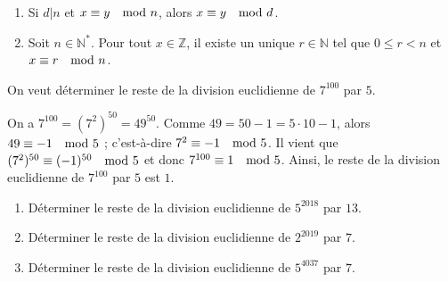       \begin{prop}
            \begin{enumerate}
                  \item Si $d|n$ et $x \equiv y \quad \mathrm{mod}\ n$, alors $x \equiv y \quad \mathrm{mod}\ d$.
                  \item Soit $n\in\mathbb{N}^*$.
                        Pour tout $x\in\mathbb{Z}$, il existe un unique $r\in\mathbb{N}$ tel que
                        $0\leq r < n$ et $x \equiv r \quad \mathrm{mod}\ n$.
            \end{enumerate}
      \end{prop}
      \begin{ex}
            On veut d\'eterminer le reste de la division euclidienne de $7^{100}$ par $5$.
            
            On a $7^{100} = (7^2)^{50} = 49^{50}$.
            Comme $49 = 50 - 1 = 5 \cdot 10 - 1$,
            alors  $49 \equiv -1 \quad \mathrm{mod}\ 5$ ; c'est-\`a-dire $7^2 \equiv -1 \quad \mathrm{mod}\ 5$.
            Il vient que $(7^2)^{50} \equiv (-1)^{50} \quad \mathrm{mod}\ 5$ et donc $7^{100} \equiv 1 \quad \mathrm{mod}\ 5$.
            Ainsi, le reste de la division euclidienne de $7^{100}$ par $5$ est $1$.
      \end{ex}
      \begin{exe}\label{exe:arith-3}
            \begin{enumerate}
                  \item D\'eterminer le reste de la division euclidienne de $5^{2018}$ par $13$.
                  \item D\'eterminer le reste de la division euclidienne de $2^{2019}$ par $7$.
                  \item D\'eterminer le reste de la division euclidienne de $5^{4037}$ par $7$.
            \end{enumerate}
      \end{exe}
